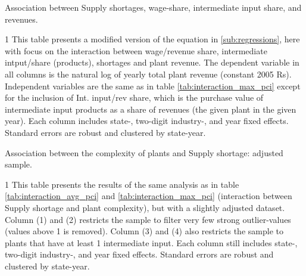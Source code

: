 \documentclass[11pt]{article}
\begin{document}
\begin{table}[H]
	\begin{center}
		\begin{threeparttable}
		\caption{Association between Supply shortages, wage-share, intermediate input share, and revenues.}
			\label{tab:interaction_wage_input}
			
			\begin{tablenotes} \footnotesize
			\item[1] This table presents a modified version of the equation in \ref{sub:regressions}, here with focus on the interaction between wage/revenue share, intermediate intput/share (products), shortages and plant revenue. The dependent variable in all columns is the natural log of yearly total plant revenue (constant 2005 Rs). Independent variables are the same as in table \ref{tab:interaction_max_pci} except for the inclusion of Int. input/rev share, which is the purchase value of intermediate input products as a share of revenues (the given plant in the given year). Each column includes state-, two-digit industry-, and year fixed effects. Standard errors are robust and clustered by state-year.
			\end{tablenotes}
		\end{threeparttable}
	\end{center}
\end{table}

\begin{table}[H] 
	\begin{center}
		\begin{threeparttable}
			\caption{Association between the complexity of plants and Supply shortage: adjusted sample.}
			\label{tab:filtered_input}
			
			\begin{tablenotes} \footnotesize 
			\item[1] This table presents the results of the same analysis as in table \ref{tab:interaction_avg_pci} and \ref{tab:interaction_max_pci} (interaction between Supply shortage and plant complexity), but with a slightly adjusted dataset. Column (1) and (2) restricts the sample to filter very few strong outlier-values (values above 1 is removed). Column (3) and (4) also restricts the sample to plants that have at least 1 intermediate input. Each column still includes state-, two-digit industry-, and year fixed effects. Standard errors are robust and clustered by state-year.
			\end{tablenotes}
		\end{threeparttable}
	\end{center}
\end{table}   
\end{document}
